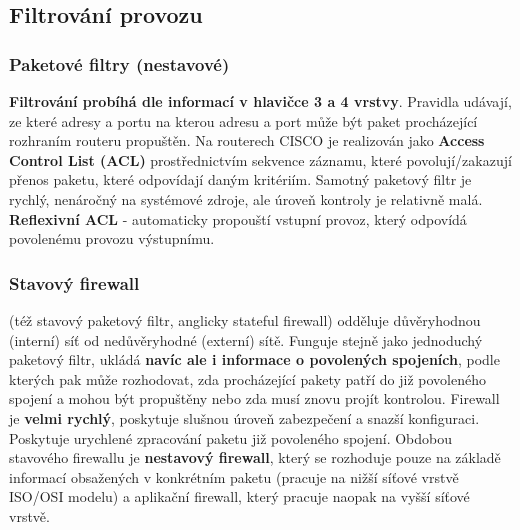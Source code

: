 \subsection{Filtrování provozu}
\subsubsection{Paketové filtry (nestavové)}
\textbf{Filtrování probíhá dle informací v hlavičce 3 a 4 vrstvy}. Pravidla udávají, ze které adresy a portu na kterou adresu a port může být paket procházející rozhraním routeru propuštěn. Na routerech CISCO je realizován jako \textbf{Access Control List (ACL)} prostřednictvím sekvence záznamu, které povolují/zakazují přenos paketu, které odpovídají daným kritériím. Samotný paketový filtr je rychlý, nenáročný na systémové zdroje, ale úroveň kontroly je relativně malá. \textbf{Reflexivní ACL} - automaticky propouští vstupní provoz, který odpovídá povolenému provozu výstupnímu.

\subsubsection{Stavový firewall}
(též stavový paketový filtr, anglicky stateful firewall) odděluje důvěryhodnou (interní) síť od nedůvěryhodné (externí) sítě. Funguje stejně jako jednoduchý paketový filtr, ukládá \textbf{navíc ale i informace o povolených spojeních}, podle kterých pak může rozhodovat, zda procházející pakety patří do již povoleného spojení a mohou být propuštěny nebo zda musí znovu projít kontrolou. Firewall je \textbf{velmi rychlý}, poskytuje slušnou úroveň zabezpečení a snazší konfiguraci.  Poskytuje urychlené zpracování paketu již povoleného spojení. Obdobou stavového firewallu je \textbf{nestavový firewall}, který se rozhoduje pouze na základě informací obsažených v konkrétním paketu (pracuje na nižší síťové vrstvě ISO/OSI modelu) a aplikační firewall, který pracuje naopak na vyšší síťové vrstvě. 
\\\\
\noindent{}

